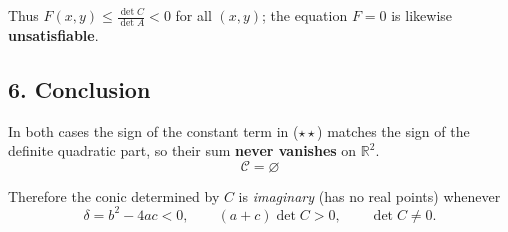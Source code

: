 Thus $F(x,y)\le\frac{\det C}{\det A}<0$ for all $(x,y)$; the equation $F=0$ is likewise \textbf{unsatisfiable}.

\subsection*{6. Conclusion}

In both cases the sign of the constant term in ($\star\star$) matches the sign of the definite quadratic part, so their sum \textbf{never vanishes} on $\mathbb{R}^{2}$.
\[
\boxed{\;
\mathcal{C}=\varnothing
\;}
\]

Therefore the conic determined by $C$ is \emph{imaginary} (has no real points) whenever
\[
\delta=b^{2}-4ac<0,\qquad (a+c)\det C>0,\qquad\det C\neq0.
\]